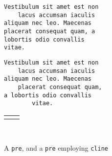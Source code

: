 \documentclass[10pt,]{article}
\theoremstyle{plain}
\theoremstyle{definition}
\theoremstyle{definition}
\theoremstyle{definition}
\theoremstyle{definition}
\theoremstyle{definition}
\theoremstyle{definition}
\numberwithin{equation}{section}
\newlength{\panelmax}
\begin{document}
\begin{figure}
\centering
{%
\setlength{\panelmax}{0pt}
\ifdefined\panelboxApre\else\newsavebox{\panelboxApre}\fi%
\begin{lrbox}{\panelboxApre}
\begin{BVerbatim}[boxwidth=0.4\linewidth,baseline=b]
Vestibulum sit amet est non
    lacus accumsan iaculis
aliquam nec leo. Maecenas
placerat consequat quam, a
lobortis odio convallis
vitae.
\end{BVerbatim}
\end{lrbox}
\ifdefined\phApre\else\newlength{\phApre}\fi%
\setlength{\phApre}{\ht\panelboxApre+\dp\panelboxApre}
\settototalheight{\phApre}{\usebox{\panelboxApre}}
\setlength{\panelmax}{\maxof{\panelmax}{\phApre}}
\ifdefined\panelboxBpre\else\newsavebox{\panelboxBpre}\fi%
\begin{lrbox}{\panelboxBpre}
\begin{BVerbatim}[boxwidth=0.45\linewidth,baseline=b]
Vestibulum sit amet est non
    lacus accumsan iaculis
aliquam nec leo. Maecenas
    placerat consequat quam,
a lobortis odio convallis
        vitae.
\end{BVerbatim}
\end{lrbox}
\ifdefined\phBpre\else\newlength{\phBpre}\fi%
\setlength{\phBpre}{\ht\panelboxBpre+\dp\panelboxBpre}
\settototalheight{\phBpre}{\usebox{\panelboxBpre}}
\setlength{\panelmax}{\maxof{\panelmax}{\phBpre}}
\leavevmode%
\setlength{\tabcolsep}{0.025\linewidth}
\par\medskip\noindent
\hspace*{0.05\linewidth}%
\begin{tabular}{@{}*{2}{c}@{}}
\begin{minipage}[c][\panelmax][t]{0.4\linewidth}\usebox{\panelboxApre}\end{minipage}&
\begin{minipage}[c][\panelmax][t]{0.45\linewidth}\usebox{\panelboxBpre}\end{minipage}\end{tabular}\\
}%
\caption{A \lstinline?pre?, and a \lstinline?pre? employing \lstinline?cline?\label{figure-118}}
\end{figure}
\end{document}
